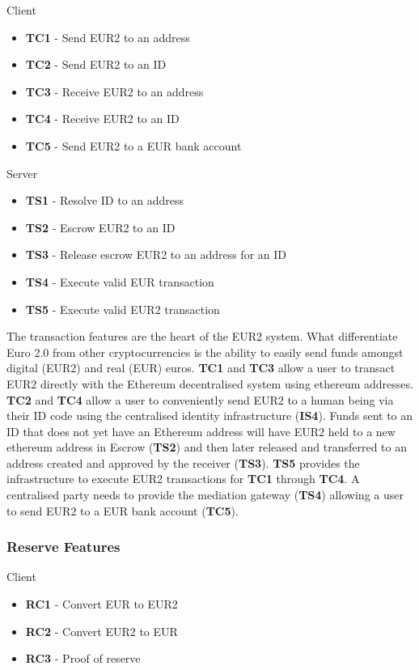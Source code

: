 \documentclass[12pt]{article} %
\begin{document}
{{Client
\begin{itemize}
	\item \textbf{TC1} - Send EUR2 to an address
	\item \textbf{TC2} - Send EUR2 to an ID
	\item \textbf{TC3} - Receive EUR2 to an address
	\item \textbf{TC4} - Receive EUR2 to an ID
	\item \textbf{TC5} - Send EUR2 to a EUR bank account
\end{itemize}

Server
\begin{itemize}
	\item \textbf{TS1} - Resolve ID to an address
	\item \textbf{TS2} - Escrow EUR2 to an ID
	\item \textbf{TS3} - Release escrow EUR2 to an address for an ID
	\item \textbf{TS4} - Execute valid EUR transaction
	\item \textbf{TS5} - Execute valid EUR2 transaction
\end{itemize}

The transaction features are the heart of the EUR2 system. What differentiate Euro 2.0 from other cryptocurrencies is the ability to easily send funds amongst digital (EUR2) and real (EUR) euros. \textbf{TC1} and \textbf{TC3} allow a user to transact EUR2 directly with the Ethereum decentralised system using ethereum addresses. \textbf{TC2} and \textbf{TC4} allow a user to conveniently send EUR2 to a human being via their ID code using the centralised identity infrastructure (\textbf{IS4}). Funds sent to an ID that does not yet have an Ethereum address will have EUR2 held to a new ethereum address in Escrow (\textbf{TS2}) and then later released and transferred to an address created and approved by the receiver (\textbf{TS3}). \textbf{TS5} provides the infrastructure to execute EUR2 transactions for \textbf{TC1} through \textbf{TC4}. A centralised party needs to provide the mediation gateway (\textbf{TS4}) allowing a user to send EUR2 to a EUR bank account (\textbf{TC5}).

\subsubsection{Reserve Features} \label{sssec:3.3:reserve}

Client
\begin{itemize}
	\item \textbf{RC1} - Convert EUR to EUR2
	\item \textbf{RC2} - Convert EUR2 to EUR
	\item \textbf{RC3} - Proof of reserve
\end{itemize}

}}
\end{document}
